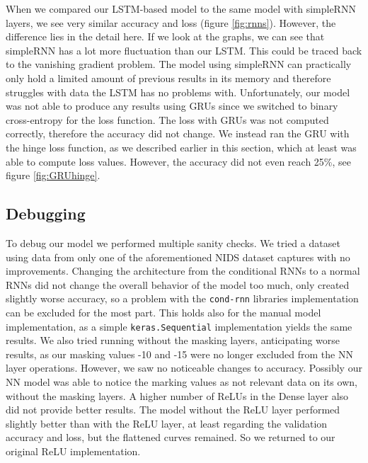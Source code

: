 \documentclass[
	ngerman,
	ruledheaders=section,%
	class=report,%
	thesis={type=bachelor},%
	accentcolor=9c,%
	custommargins=true,%
	marginpar=false,%
	parskip=half-,%
	fontsize=11pt,%
	twoside
]{tudapub}
\let\code\texttt
\begin{document}
When we compared our LSTM-based model to the same model with simpleRNN layers, we see very similar accuracy and loss (figure \ref{fig:rnns}).
However, the difference lies in the detail here.
If we look at the graphs, we can see that simpleRNN has a lot more fluctuation than our LSTM.
This could be traced back to the vanishing gradient problem.
The model using simpleRNN can practically only hold a limited amount of previous results in its memory and therefore struggles with data the LSTM has no problems with.
Unfortunately, our model was not able to produce any results using GRUs since we switched to binary cross-entropy for the loss function.
The loss with GRUs was not computed correctly, therefore the accuracy did not change.
We instead ran the GRU with the hinge loss function, as we described earlier in this section, which at least was able to compute loss values.
However, the accuracy did not even reach 25\%, see figure \ref{fig:GRUhinge}.

\subsection{Debugging}
\label{sec:debugging}

To debug our model we performed multiple sanity checks.
We tried a dataset using data from only one of the aforementioned NIDS dataset captures with no improvements.
Changing the architecture from the conditional RNNs to a normal RNNs did not change the overall behavior of the model too much, only created slightly worse accuracy, so a problem with the \code{cond-rnn} libraries implementation can be excluded for the most part.
This holds also for the manual model implementation, as a simple \code{keras.Sequential} implementation yields the same results.
We also tried running without the masking layers, anticipating worse results, as our masking values -10 and -15 were no longer excluded from the NN layer operations.
However, we saw no noticeable changes to accuracy.
Possibly our NN model was able to notice the marking values as not relevant data on its own, without the masking layers.
A higher number of ReLUs in the Dense layer also did not provide better results.
The model without the ReLU layer performed slightly better than with the ReLU layer,
at least regarding the validation accuracy and loss, but the flattened curves remained. %
So we returned to our original ReLU implementation.
\end{document}

